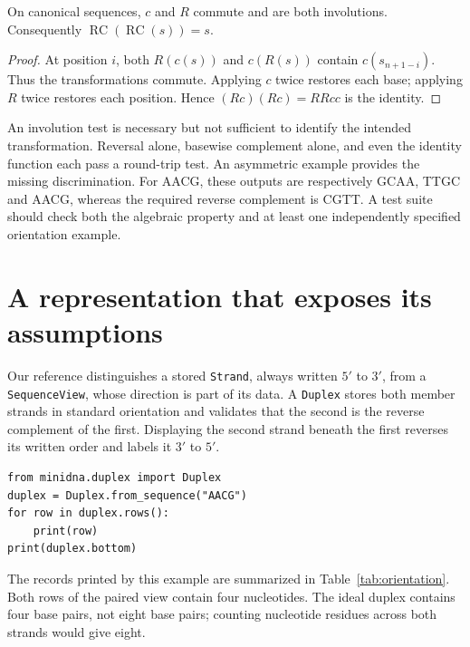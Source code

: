 \begin{proposition}
On canonical sequences, $c$ and $R$ commute and are both involutions.
Consequently $\operatorname{RC}(\operatorname{RC}(s))=s$.
\end{proposition}
\begin{proof}
At position $i$, both $R(c(s))$ and $c(R(s))$ contain $c(s_{n+1-i})$.
Thus the transformations commute. Applying $c$ twice restores each base;
applying $R$ twice restores each position. Hence
$(Rc)(Rc)=RRcc$ is the identity.
\end{proof}

An involution test is necessary but not sufficient to identify the intended
transformation. Reversal alone, basewise complement alone, and even the identity
function each pass a round-trip test. An asymmetric example provides the
missing discrimination. For AACG, these outputs are respectively GCAA, TTGC
and AACG, whereas the required reverse complement is CGTT. A test suite should
check both the algebraic property and at least one independently specified
orientation example.

\section{A representation that exposes its assumptions}
Our reference distinguishes a stored \texttt{Strand}, always written $5'$ to
$3'$, from a \texttt{SequenceView}, whose direction is part of its data.
A \texttt{Duplex} stores both member strands in standard orientation and
validates that the second is the reverse complement of the first. Displaying
the second strand beneath the first reverses its written order and labels it
$3'$ to $5'$.

\begin{minipage}{\textwidth}
\begin{Verbatim}[fontsize=\small]
from minidna.duplex import Duplex
duplex = Duplex.from_sequence("AACG")
for row in duplex.rows():
    print(row)
print(duplex.bottom)
\end{Verbatim}
\end{minipage}

The records printed by this example are summarized in
Table~\ref{tab:orientation}. Both rows of the paired view contain four
nucleotides. The ideal duplex contains four base pairs, not eight base pairs;
counting nucleotide residues across both strands would give eight.

\begin{table}[htbp]
\centering

\caption{Generated views of the same ideal duplex. Direction belongs to the
representation and must travel with the letters.}
\label{tab:orientation}
\end{table}


